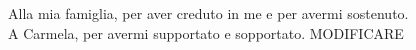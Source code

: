 \newpage\null\thispagestyle{empty}\newpage %
\thispagestyle{empty}
\newenvironment{dedication}
  {\clearpage           %
   \thispagestyle{empty}%
   \vspace*{\stretch{1}}%
   \itshape             %
   \raggedleft          %
  }
  {\par %
   \vspace{\stretch{3}} %
   \clearpage           %
  }

\begin{dedication}
Alla mia famiglia, per aver creduto in me e per avermi sostenuto.\\
A Carmela, per avermi supportato e sopportato.
MODIFICARE
\end{dedication}